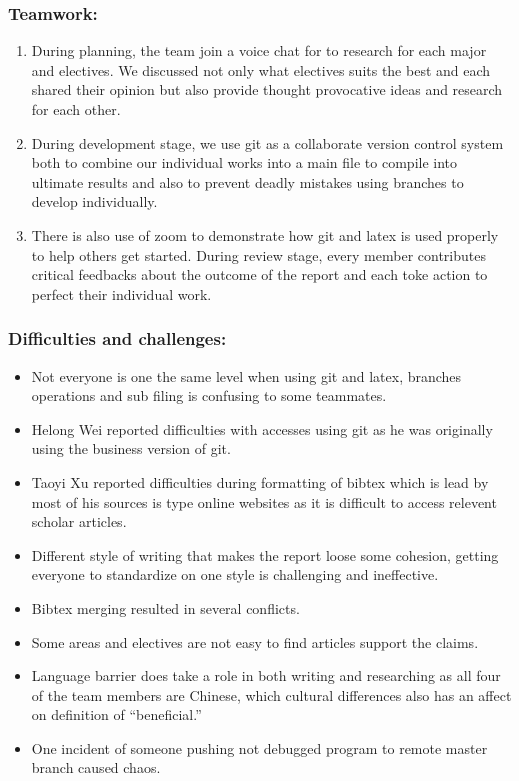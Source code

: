 \documentclass{article}
\begin{document}
	\subsubsection{Teamwork:}
	\begin{enumerate}
		\item During planning, the team join a voice chat for to research for each major and electives. We discussed not only what electives suits the best and each shared their opinion but also provide thought provocative ideas and research for each other.
		\item During development stage, we use git as a collaborate version control system both to combine our individual works into a main file to compile into ultimate results and also to prevent deadly mistakes using branches to develop individually. 
		\item There is also use of zoom to demonstrate how git and latex is used properly to help others get started.
	During review stage, every member contributes critical feedbacks about the outcome of the report and each toke action to perfect their individual work.
	\end{enumerate}
	
	\subsubsection{Difficulties and challenges:}
	\begin{itemize}
		\item Not everyone is one the same level when using git and latex, branches operations and sub filing is confusing to some teammates.
		\item Helong Wei reported difficulties with accesses using git as he was originally using the business version of git.
		\item Taoyi Xu reported difficulties during formatting of bibtex which is lead by most of his sources is type online websites as it is difficult to access relevent scholar articles.
		\item Different style of writing that makes the report loose some cohesion, getting everyone to standardize on one style is challenging and ineffective.
		\item Bibtex merging resulted in several conflicts.
		\item Some areas and electives are not easy to find articles support the claims.
		\item Language barrier does take a role in both writing and researching as all four of the team members are Chinese, which cultural differences also has an affect on definition of “beneficial.”
		\item One incident of someone pushing not debugged program to remote master branch caused chaos.
	\end{itemize}
	
\end{document}
